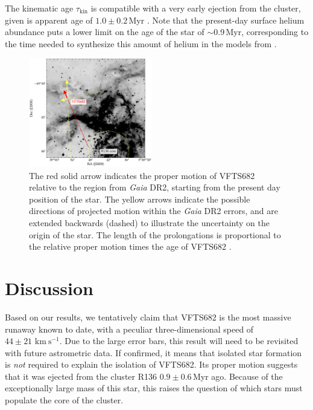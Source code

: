 \documentclass[apjl,twocolumn]{emulateapj}
\newcommand{\todo}[1]{{\large $\blacksquare$~\textbf{\color{red}[#1]}}~$\blacksquare$}
\newcommand{\kms}{{\,\mathrm{km\ s^{-1}}}}
\begin{document}
The kinematic age $\tau_\mathrm{kin}$ is compatible with a very early
ejection from the cluster, given is apparent age
of $1.0\pm 0.2$\,Myr \citep{schneider:18}. %
Note that the
present-day surface helium abundance
\citep[$Y\simeq0.5$,][]{bestenlehner:11, rubio-diez:17} puts a lower
limit on the age of the star of $\sim$0.9\,Myr, corresponding to the time needed to
synthesize this amount of helium in the models from \cite{kohler:15}.

\begin{figure}%
  \centering
  \includegraphics[width=0.48\textwidth]{./figures/main_plot_good_gaia_only}  
  \caption{The red solid arrow indicates the proper motion of VFTS682
    relative to the region from \emph{Gaia} DR2, starting from the present day position of
    the star. The yellow arrows indicate the possible
    directions of projected motion within the \emph{Gaia} DR2 errors, and are extended
    backwards (dashed) to illustrate the uncertainty on the origin of the
    star. The length of the prolongations is proportional to the relative proper motion
    times the age of VFTS682 \citep[$1.0\pm0.2$\,Myr,][]{schneider:18}.
  }
  
  \label{fig:main}
\end{figure}


\section{Discussion}
\label{sec:discussion}

Based on our results, we tentatively claim that VFTS682 is the most massive
runaway known to date, with a peculiar three-dimensional speed of
$44\pm21\,\kms$. Due to the large error bars, this result will need
to be revisited with future astrometric data. %
If confirmed, it means that isolated star formation is
\emph{not} required to explain the isolation of VFTS682. Its proper motion suggests that it was ejected from the cluster R136
$0.9\pm0.6$\,Myr ago. Because of the exceptionally large mass
of this star, this raises the question of which stars must populate
the core of the cluster.
\end{document}
